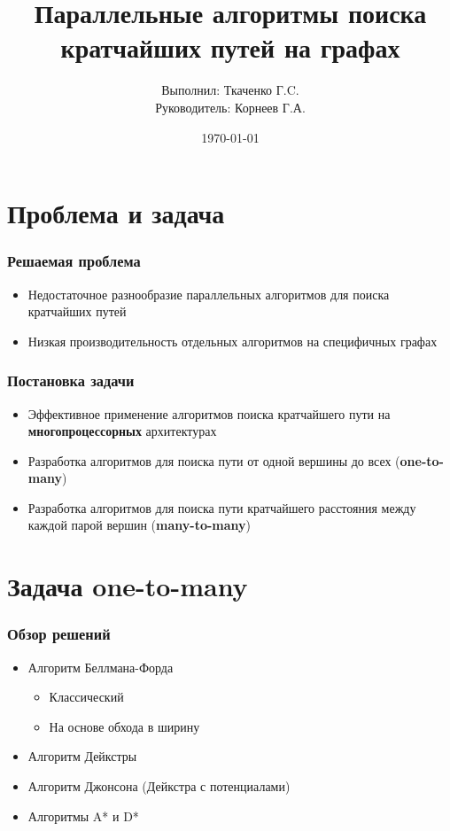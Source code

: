 \documentclass[10pt, compress]{beamer}
\title{Параллельные алгоритмы поиска кратчайших путей на графах}
\subtitle{}
\date{\today}
\author{Выполнил: Ткаченко Г.C. \\ Руководитель: Корнеев Г.А.}
\institute{Университет ИТМО}
\begin{document}
\maketitle

\section{Проблема и задача}
\begin{frame}[fragile]
  \frametitle{Решаемая проблема}

\begin{itemize}
	\item Недостаточное разнообразие параллельных алгоритмов для поиска кратчайших путей

    \item Низкая производительность отдельных алгоритмов на специфичных графах    
  \end{itemize}
\end{frame}

\begin{frame}[fragile]
  \frametitle{Постановка задачи}
\begin{itemize}
    \item Эффективное применение алгоритмов поиска кратчайшего пути на \textbf{многопроцессорных} архитектурах
    \item Разработка алгоритмов для поиска пути от одной вершины до всех (\textbf{one-to-many})
    \item Разработка алгоритмов для поиска пути кратчайшего расстояния между каждой парой вершин (\textbf{many-to-many})
  \end{itemize}
\end{frame}

\section{Задача one-to-many}

\begin{frame}[fragile]
  \frametitle{Обзор решений}
\begin{itemize}
    \item Алгоритм Беллмана-Форда
    \begin{itemize}
    	\item Классический
    	\item На основе обхода в ширину
	\end{itemize}	   
	\item Алгоритм Дейкстры
    \item Алгоритм Джонсона (Дейкстра с потенциалами)
    \item Алгоритмы A* и D*
  \end{itemize}
\end{frame}
\end{document}
